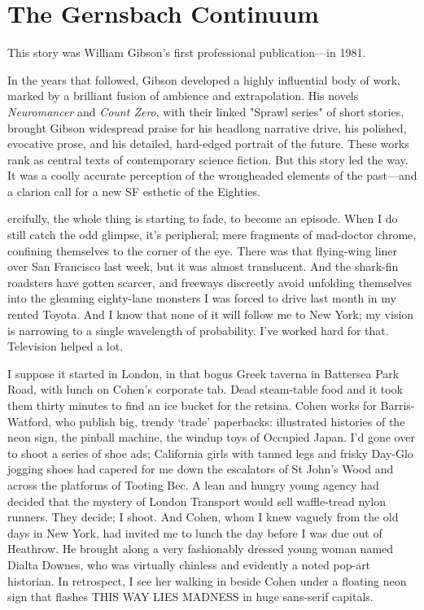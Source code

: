 \chapter{The Gernsbach Continuum}

This story was William Gibson's first professional publication---in 1981.

In the years that followed, Gibson developed a highly influential body of work, marked by a brilliant fusion of ambience and extrapolation. His novels \textit{Neuromancer} and \textit{Count Zero}, with their linked "Sprawl series" of short stories, brought Gibson widespread praise for his headlong narrative drive, his polished, evocative prose, and his detailed, hard-edged portrait of the future. These works rank as central texts of contemporary science fiction.
But this story led the way. It was a coolly accurate perception of the wrongheaded elements of the past---and a clarion call for a new SF esthetic of the Eighties.

\hrulefill

ercifully, the whole thing is starting to fade, to become an episode. When I do still catch the odd glimpse, it's peripheral; mere fragments of mad-doctor chrome, confining themselves to the corner of the eye. There was that flying-wing liner over San Francisco last week, but it was almost translucent. And the shark-fin roadsters have gotten scarcer, and freeways discreetly avoid unfolding themselves into the gleaming eighty-lane monsters I was forced to drive last month in my rented Toyota. And I know that none of it will follow me to New York; my vision is narrowing to a single wavelength of probability. I've worked hard for that. Television helped a lot.

I suppose it started in London, in that bogus Greek taverna in Battersea Park Road, with lunch on Cohen's corporate tab. Dead steam-table food and it took them thirty minutes to find an ice bucket for the retsina. Cohen works for Barris-Watford, who publish big, trendy `trade' paperbacks: illustrated histories of the neon sign, the pinball machine, the windup toys of Occupied Japan. I'd gone over to shoot a series of shoe ads; California girls with tanned legs and frisky Day-Glo jogging shoes had capered for me down the escalators of St John's Wood and across the platforms of Tooting Bec. A lean and hungry young agency had decided that the mystery of London Transport would sell waffle-tread nylon runners. They decide; I shoot. And Cohen, whom I knew vaguely from the old days in New York, had invited me to lunch the day before I was due out of Heathrow. He brought along a very fashionably dressed young woman named Dialta Downes, who was virtually chinless and evidently a noted pop-art historian. In retrospect, I see her walking in beside Cohen under a floating neon sign that flashes THIS WAY LIES MADNESS in huge sans-serif capitals.

